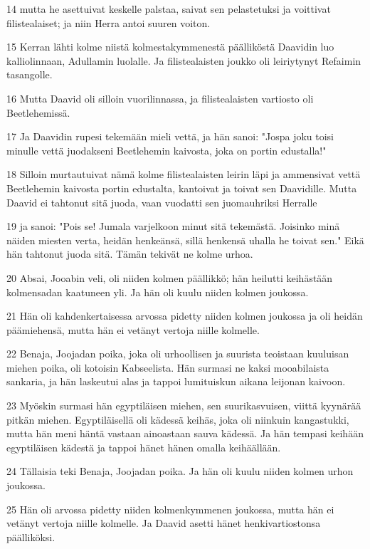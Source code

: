\par 14 mutta he asettuivat keskelle palstaa, saivat sen pelastetuksi ja voittivat filistealaiset; ja niin Herra antoi suuren voiton.
\par 15 Kerran lähti kolme niistä kolmestakymmenestä päälliköstä Daavidin luo kalliolinnaan, Adullamin luolalle. Ja filistealaisten joukko oli leiriytynyt Refaimin tasangolle.
\par 16 Mutta Daavid oli silloin vuorilinnassa, ja filistealaisten vartiosto oli Beetlehemissä.
\par 17 Ja Daavidin rupesi tekemään mieli vettä, ja hän sanoi: "Jospa joku toisi minulle vettä juodakseni Beetlehemin kaivosta, joka on portin edustalla!"
\par 18 Silloin murtautuivat nämä kolme filistealaisten leirin läpi ja ammensivat vettä Beetlehemin kaivosta portin edustalta, kantoivat ja toivat sen Daavidille. Mutta Daavid ei tahtonut sitä juoda, vaan vuodatti sen juomauhriksi Herralle
\par 19 ja sanoi: "Pois se! Jumala varjelkoon minut sitä tekemästä. Joisinko minä näiden miesten verta, heidän henkeänsä, sillä henkensä uhalla he toivat sen." Eikä hän tahtonut juoda sitä. Tämän tekivät ne kolme urhoa.
\par 20 Absai, Jooabin veli, oli niiden kolmen päällikkö; hän heilutti keihästään kolmensadan kaatuneen yli. Ja hän oli kuulu niiden kolmen joukossa.
\par 21 Hän oli kahdenkertaisessa arvossa pidetty niiden kolmen joukossa ja oli heidän päämiehensä, mutta hän ei vetänyt vertoja niille kolmelle.
\par 22 Benaja, Joojadan poika, joka oli urhoollisen ja suurista teoistaan kuuluisan miehen poika, oli kotoisin Kabseelista. Hän surmasi ne kaksi mooabilaista sankaria, ja hän laskeutui alas ja tappoi lumituiskun aikana leijonan kaivoon.
\par 23 Myöskin surmasi hän egyptiläisen miehen, sen suurikasvuisen, viittä kyynärää pitkän miehen. Egyptiläisellä oli kädessä keihäs, joka oli niinkuin kangastukki, mutta hän meni häntä vastaan ainoastaan sauva kädessä. Ja hän tempasi keihään egyptiläisen kädestä ja tappoi hänet hänen omalla keihäällään.
\par 24 Tällaisia teki Benaja, Joojadan poika. Ja hän oli kuulu niiden kolmen urhon joukossa.
\par 25 Hän oli arvossa pidetty niiden kolmenkymmenen joukossa, mutta hän ei vetänyt vertoja niille kolmelle. Ja Daavid asetti hänet henkivartiostonsa päälliköksi.
